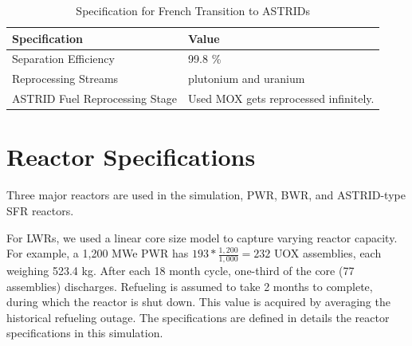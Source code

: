 \begin{table}[h]
    \centering
    \begin{tabularx}{\textwidth}{bb}
        \hline
        \textbf{Specification }& \textbf{Value} \\
        \hline
        Separation Efficiency & 99.8 \% \\
        Reprocessing Streams & plutonium and uranium \\
        \gls{ASTRID} Fuel Reprocessing Stage &  Used \gls{MOX} gets reprocessed infinitely. \\
        \hline
    \end{tabularx}
    \caption {Specification for French Transition to \glspl{ASTRID} }
    \label{tab:sim_france}
\end{table}

\pagebreak

\section{Reactor Specifications}
Three major reactors are used in the simulation, \gls{PWR}, \gls{BWR}, and ASTRID-type \gls{SFR} reactors.


For \glspl{LWR}, we used a linear core size model to capture
varying reactor capacity. For example, a 
1,200 \gls{MWe} PWR has $193*\frac{1,200}{1,000} = 232$ \gls{UOX} assemblies, each
weighing 523.4 kg.
After each 18 month cycle, one-third of the 
core (77 assemblies) discharges. Refueling
is assumed to take 2 months to complete, during which the reactor
is shut down. This value is acquired by averaging the 
historical refueling outage. The specifications are defined in 
 details the reactor specifications in this simulation.

